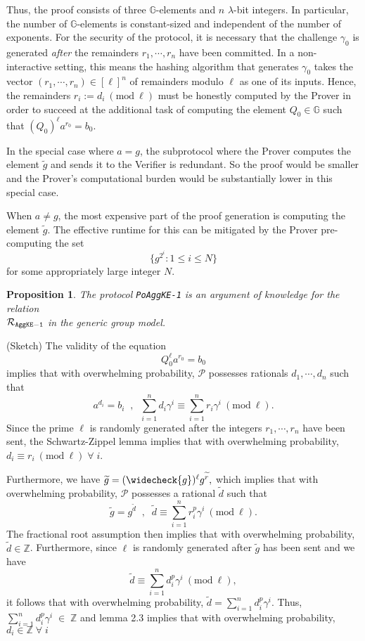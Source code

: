 \documentclass[11pt, lettersize, notitlepage, leqno, footskip=0.6cm]{article}
\newcommand{\bz}{\mathbb Z}
\newcommand{\slim}{\sum\limits}
\newcommand{\wti}{\widetilde}
\newcommand{\mc}{\mathcal}
\newcommand{\mb}{\mathbb}
\newcommand{\lam}{\lambda}
\newcommand{\weck}{\widecheck}
\newcommand{\mP}{\mc{P}}
\newcommand{\vs}{\vspace{-0.15cm}}
\newcommand{\op}{overwhelming probability}
\newcommand{\Mod}[1]{\ (\mathrm{mod}\ #1)}
\newtheorem{Prop}[Thm]{Proposition}
\numberwithin{equation}{section}
\begin{document}
Thus, the proof consists of three $\mb{G}$-elements and $n$ $\lam$-bit integers. In particular, the number of $\mb{G}$-elements is constant-sized and independent of the number of exponents. For the security of the protocol, it is necessary that the challenge $\gamma_0$ is generated \textit{after} the remainders $r_1,\cdots,r_n$ have been committed. In a non-interactive setting, this means the hashing algorithm that generates $\gamma_0$ takes the vector $(r_1,\cdots,r_n)\in [\ell]^n$ of remainders modulo $\ell$ as one of its inputs. Hence, the remainders $r_i:= d_i\Mod{\ell}$ must be honestly computed by the Prover in order to succeed at the additional task of computing the element $Q_0\in\mb{G}$ such that $(Q_0)^{\ell}a^{r_0} = b_0$.

In the special case where $a = g$, the subprotocol where the Prover computes the element $\wti{g}$ and sends it to the Verifier is redundant. So the proof would be smaller and the Prover's computational burden would be substantially lower in this special case.

When $a \neq g$, the most expensive part of the proof generation is computing the element $\wti{g}$. The effective runtime for this can be mitigated by the Prover pre-computing the set \vs $$\{g^{2^i}: 1\leq i \leq N \}$$ for some appropriately large integer $N$.
\vspace{0.2cm}

\begin{Prop} The protocol \verb|PoAggKE-1| is an argument of knowledge for the relation\\ $\mc{R}_{{\tt{AggKE-1}}}$ in the generic group model.\end{Prop}

\begin{prf} (Sketch) The validity of the equation \vs $$Q_0^{\ell}a^{r_0} = b_0$$ implies that with \op, 
$\mP$ possesses rationals $d_1,\cdots,d_n$ such that \vs $$a^{d_i} = b_i \;\;,\;\;\slim_{i=1}^{n} d_i\gamma^i \equiv \slim_{i=1}^{n} r_i\gamma^i\Mod{\ell}.$$ Since the prime $\ell$ is randomly generated after the integers $r_1,\cdots,r_n$ have been sent, the Schwartz-Zippel lemma implies that with \op, $d_i\equiv r_i\Mod{\ell}\;\forall\;i$. 

Furthermore, we have $\wti{g} = (\weck{g})^{\ell}g^{\wti{r}},$ which implies that with \op, $\mP$ possesses a rational $\wti{d}$ such that \vs $$\wti{g} = g^{\wti{d}}\;\;,\;\;\wti{d}\equiv \slim_{i=1}^n r_i^p\gamma^i\Mod{\ell} .$$ The fractional root assumption then implies that with \op, $\wti{d}\in \bz$. Furthermore, since $\ell$ is randomly generated after $\wti{g}$ has been sent and we have \vs $$\wti{d}\equiv \slim_{i=1}^nd_i^p\gamma^i\Mod{\ell},$$ it follows that with \op, $\wti{d} = \slim_{i=1}^n d_i^p\gamma^i$. Thus, $\slim_{i=1}^n d_i^p \gamma^i\;\in\;\bz$ and lemma 2.3 implies that with \op, $d_i\in\bz\;\forall\;i$\end{prf}
\end{document}
